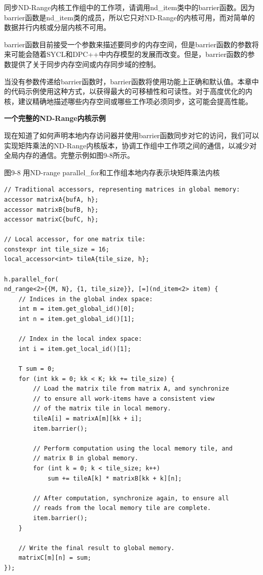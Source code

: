 同步ND-Range内核工作组中的工作项，请调用nd\_item类中的barrier函数。因为barrier函数是nd\_item类的成员，所以它只对ND-Range的内核可用，而对简单的数据并行内核或分层内核不可用。\par

barrier函数目前接受一个参数来描述要同步的内存空间，但是barrier函数的参数将来可能会随着SYCL和DPC++中内存模型的发展而改变。但是，barrier函数的参数提供了关于同步内存空间或内存同步域的控制。\par

当没有参数传递给barrier函数时，barrier函数将使用功能上正确和默认值。本章中的代码示例使用这种方式，以获得最大的可移植性和可读性。对于高度优化的内核，建议精确地描述哪些内存空间或哪些工作项必须同步，这可能会提高性能。\par

\hspace*{\fill} \par %
\textbf{一个完整的ND-Range内核示例}

现在知道了如何声明本地内存访问器并使用barrier函数同步对它的访问，我们可以实现矩阵乘法的ND-Range内核版本，协调工作组中工作项之间的通信，以减少对全局内存的通信。完整示例如图9-8所示。\par

\hspace*{\fill} \par %
图9-8 用ND-range parallel\_for和工作组本地内存表示块矩阵乘法内核
\begin{lstlisting}[caption={}]
// Traditional accessors, representing matrices in global memory:
accessor matrixA{bufA, h};
accessor matrixB{bufB, h};
accessor matrixC{bufC, h};

// Local accessor, for one matrix tile:
constexpr int tile_size = 16;
local_accessor<int> tileA{tile_size, h};

h.parallel_for(
nd_range<2>{{M, N}, {1, tile_size}}, [=](nd_item<2> item) {
	// Indices in the global index space:
	int m = item.get_global_id()[0];
	int n = item.get_global_id()[1];
	
	// Index in the local index space:
	int i = item.get_local_id()[1];
	
	T sum = 0;
	for (int kk = 0; kk < K; kk += tile_size) {
		// Load the matrix tile from matrix A, and synchronize
		// to ensure all work-items have a consistent view
		// of the matrix tile in local memory.
		tileA[i] = matrixA[m][kk + i];
		item.barrier();
		
		// Perform computation using the local memory tile, and
		// matrix B in global memory.
		for (int k = 0; k < tile_size; k++)
			sum += tileA[k] * matrixB[kk + k][n];
		
		// After computation, synchronize again, to ensure all
		// reads from the local memory tile are complete.
		item.barrier();
	}

	// Write the final result to global memory.
	matrixC[m][n] = sum;
});
\end{lstlisting}

